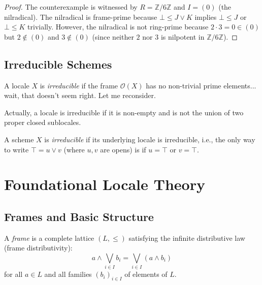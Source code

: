 \begin{proof}
  \leanok
  The counterexample is witnessed by $R = \mathbb{Z}/6\mathbb{Z}$ and $I = (0)$ (the nilradical).
  The nilradical is frame-prime because $\bot \leq J \vee K$ implies $\bot \leq J$ or $\bot \leq K$ trivially.
  However, the nilradical is not ring-prime because $2 \cdot 3 = 0 \in (0)$ but $2 \notin (0)$ and $3 \notin (0)$
  (since neither $2$ nor $3$ is nilpotent in $\mathbb{Z}/6\mathbb{Z}$).
\end{proof}

\section{Irreducible Schemes}

\begin{definition}
  \label{def:irreducible-locale}
  \leanok
  A locale $X$ is \emph{irreducible} if the frame $\mathcal{O}(X)$ has no non-trivial prime elements... 
  wait, that doesn't seem right. Let me reconsider.
  
  Actually, a locale is irreducible if it is non-empty and is not the union of two proper closed sublocales.
\end{definition}

\begin{definition}
  \label{def:irreducible-scheme}
  \leanok
  A scheme $X$ is \emph{irreducible} if its underlying locale is irreducible, i.e., 
  the only way to write $\top = u \lor v$ (where $u, v$ are opens) is if $u = \top$ or $v = \top$.
\end{definition}


\chapter{Foundational Locale Theory}

\section{Frames and Basic Structure}

\begin{definition}[Frame]
  \label{def:frame}
  \leanok
  A \emph{frame} is a complete lattice $(L, \leq)$ satisfying the infinite distributive law (frame distributivity):
  $$a \land \bigvee_{i \in I} b_i = \bigvee_{i \in I} (a \land b_i)$$
  for all $a \in L$ and all families $(b_i)_{i \in I}$ of elements of $L$.
\end{definition}


